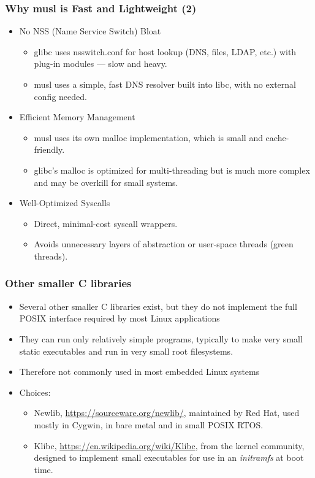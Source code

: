 \begin{frame}
  \frametitle{Why musl is Fast and Lightweight (2)}
  \begin{itemize}
  \item No NSS (Name Service Switch) Bloat
    \begin{itemize}
    \item glibc uses nsswitch.conf for host lookup (DNS, files, LDAP, etc.)
    with plug-in modules — slow and heavy.
    \item musl uses a simple, fast DNS resolver built into libc, with no external
    config needed.
    \end{itemize}
  \item Efficient Memory Management
    \begin{itemize}
    \item musl uses its own malloc implementation, which is small and
    cache-friendly.
    \item glibc's malloc is optimized for multi-threading but is much more complex
    and may be overkill for small systems.
    \end{itemize}
  \item Well-Optimized Syscalls
    \begin{itemize}
      \item Direct, minimal-cost syscall wrappers.
      \item Avoids unnecessary layers of abstraction or user-space threads (green threads).
    \end{itemize}
  \end{itemize}
\end{frame}

\begin{frame}
  \frametitle{Other smaller C libraries}
  \begin{itemize}
  \item Several other smaller C libraries exist, but they do not
        implement the full POSIX interface required by most Linux
        applications
  \item They can run only relatively simple programs, typically to
        make very small static executables and run in very small root
        filesystems.
  \item Therefore not commonly used in most embedded Linux systems
  \item Choices:
    \begin{itemize}
    \item Newlib, \url{https://sourceware.org/newlib/}, maintained by
          Red Hat, used mostly in Cygwin, in bare metal and in small POSIX RTOS.
    \item Klibc, \url{https://en.wikipedia.org/wiki/Klibc}, from the
          kernel community, designed to implement small executables for
          use in an {\em initramfs} at boot time.
    \end{itemize}
  \end{itemize}
\end{frame}

